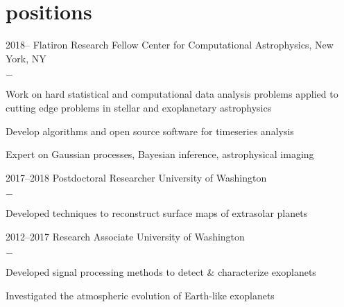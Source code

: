 \documentclass[]{luger-cv} %
\begin{document}

\section{positions}

\begin{entrylist}


    \entry
    {2018--}
    {Flatiron Research Fellow}
    {Center for Computational Astrophysics, New York, NY}
    {%
        \vspace{-1em}
        \begin{list}{{\color{numcolor}$-$}}{\cvlist}
            \item Work on hard statistical and computational data analysis problems
                  applied to cutting edge problems in stellar and exoplanetary astrophysics
            \item Develop algorithms and open source software for timeseries analysis
            \item Expert on Gaussian processes, Bayesian inference, astrophysical imaging
        \end{list}
    }


    \entry
    {2017--2018}
    {Postdoctoral Researcher}
    {University of Washington}
    {%
        \vspace{-1em}
        \begin{list}{{\color{numcolor}$-$}}{\cvlist}
            \item Developed techniques to reconstruct surface maps of extrasolar planets
        \end{list}
    }


    \entry
    {2012--2017}
    {Research Associate}
    {University of Washington}
    {%
        \vspace{-1em}
        \begin{list}{{\color{numcolor}$-$}}{\cvlist}
            \item Developed signal processing methods to detect \& characterize exoplanets
            \item Investigated the atmospheric evolution of Earth-like exoplanets
        \end{list}
    }


\end{entrylist}
\end{document}
